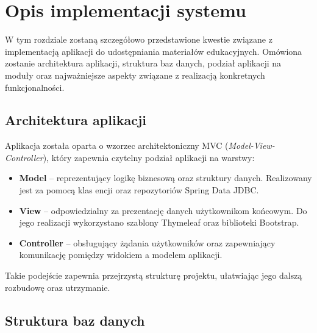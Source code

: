 %


\sloppy

\chapter{Opis implementacji systemu}

W tym rozdziale zostaną szczegółowo przedstawione kwestie związane z implementacją aplikacji do udostępniania materiałów edukacyjnych. Omówiona zostanie architektura aplikacji, struktura baz danych, podział aplikacji na moduły oraz najważniejsze aspekty związane z realizacją konkretnych funkcjonalności.

\section{Architektura aplikacji}

Aplikacja została oparta o wzorzec architektoniczny MVC (\textit{Model-View-Controller}), który zapewnia czytelny podział aplikacji na warstwy:

\begin{itemize}
    \item \textbf{Model} – reprezentujący logikę biznesową oraz struktury danych. Realizowany jest za pomocą klas encji oraz repozytoriów Spring Data JDBC.
    \item \textbf{View} – odpowiedzialny za prezentację danych użytkownikom końcowym. Do jego realizacji wykorzystano szablony Thymeleaf oraz biblioteki Bootstrap.
    \item \textbf{Controller} – obsługujący żądania użytkowników oraz zapewniający komunikację pomiędzy widokiem a modelem aplikacji.
\end{itemize}

Takie podejście zapewnia przejrzystą strukturę projektu, ułatwiając jego dalszą rozbudowę oraz utrzymanie.

\section{Struktura baz danych}

